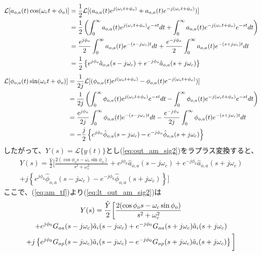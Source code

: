 \documentclass[book]{jlreq}
\begin{document}
\begin{align}
    \mathcal{L} [a_{o,a}(t)\cos(\omega_c t+\phi_o)]
     & = \frac{1}{2}\mathcal{L}[(a_{o,a}(t) e^{j(\omega_c t+\phi_o)}+a_{o,a}(t) e^{-j(\omega_c t+\phi_o)})]\notag \\
     & = \frac{1}{2}\left(\int_0^\infty a_{o,a}(t) e^{j(\omega_c t+\phi_o)} e^{-st} dt
    + \int_0^\infty a_{o,a}(t) e^{-j(\omega_c t+\phi_o)} e^{-st} dt \right)\notag                                 \\
     & = \frac{e^{j\phi_o}}{2}\int_0^\infty a_{o,a}(t) e^{-(s-j\omega_c) t} dt
    + \frac{e^{-j\phi_o}}{2}\int_0^\infty a_{o,a}(t) e^{-(s+j\omega_c) t} dt\notag                                \\
     & = \frac{1}{2}\left\{e^{j\phi_o}\hat{a}_{o,a}(s-j\omega_c) + e^{-j\phi_o}\hat{a}_{o,a}(s+j\omega_c)\right\}
\end{align}
%
\begin{align}
    \mathcal{L} [\phi_{o,a}(t)\sin(\omega_c t+\phi_o)]
     & = \frac{1}{2j}\mathcal{L}[(\phi_{o,a}(t) e^{j(\omega_c t+\phi_o)} - \phi_{o,a}(t) e^{-j(\omega_c t+\phi_o)})]\notag \\
     & = \frac{1}{2j}\left(\int_0^\infty \phi_{o,a}(t) e^{j(\omega_c t+\phi_o)} e^{-st} dt
    - \int_0^\infty \phi_{o,a}(t) e^{-j(\omega_c t+\phi_o)} e^{-st} dt \right)\notag                                       \\
     & = \frac{e^{j\phi_o}}{2j}\int_0^\infty \phi_{o,a}(t) e^{-(s-j\omega_c) t} dt
    - \frac{e^{-j\phi_o}}{2j}\int_0^\infty \phi_{o,a}(t) e^{-(s+j\omega_c) t} dt\notag                                     \\
     & = -\frac{j}{2}\left\{e^{j\phi_o}\hat{\phi}_{o,a}(s-j\omega_c) - e^{-j\phi_o} \hat{\phi}_{o,a}(s+j\omega_c)\right\}
\end{align}
%
したがって、$Y(s)=\mathcal{L}\{y(t)\}$とし(\ref{eq:out_am_sig2})をラプラス変換すると、
%
\begin{multline}
    Y(s) = \frac{\hat{Y}}{2}\biggr [ \frac{2(\cos\phi_o s - \omega_c\sin\phi_o)}{s^2+\omega_c^2}
        + e^{j\phi_0}\hat{a}_{o, a}(s - j\omega_c) + e^{-j\phi_0}\hat{a}_{o, a}(s+j\omega_c) \\
        + j\left \{e^{j\phi_0}\hat{\phi}_{o,a}(s-j\omega_c) - e^{-j\phi_0}\hat{\phi}_{o,a}(s+j\omega_c) \right \} \biggl ]
    \label{eq:lt_out_am_sig2}
\end{multline}
%
ここで、(\ref{eq:am_tf})より(\ref{eq:lt_out_am_sig2})は
%
\begin{multline}
    Y(s) = \frac{\hat{Y}}{2}\biggr [ \frac{2(\cos\phi_o s - \omega_c\sin\phi_o)}{s^2+\omega_c^2}\\
    + e^{j\phi_0}G_{aa}(s-j\omega_c)\hat{a}_i(s - j\omega_c) + e^{-j\phi_0}G_{aa}(s+j\omega_c)\hat{a}_i(s+j\omega_c) \\
    + j\left \{e^{j\phi_0}G_{ap}(s-j\omega_c)\hat{a}_i(s-j\omega_c)
    - e^{-j\phi_0}G_{ap}(s+j\omega_c)\hat{a}_i(s+j\omega_c) \right \} \biggl ]\notag
\end{multline}
\end{document}
